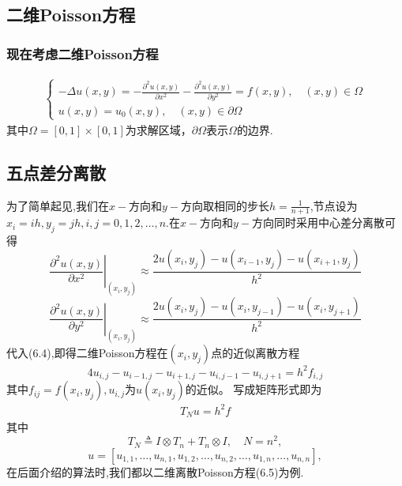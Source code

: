 \documentclass[12pt,a4paper]{article}
\begin{document}
\subsection{\color{blue}二维Poisson方程}
\subsubsection*{现在考虑二维Poisson方程}
\begin{align}
\left\{\begin{array}{l}{-\Delta u(x, y)=-\frac{\partial^{2} u(x, y)}{\partial x^{2}}-\frac{\partial^{2} u(x, y)}{\partial y^{2}}=f(x, y), \quad(x, y) \in \Omega} \\ {u(x, y)=u_{0}(x, y), \quad(x, y) \in \partial \Omega}\end{array}\right.
\tag{6.4}
\end{align}
其中$\Omega=[0,1] \times[0,1]$为求解区域，$\partial \Omega$表示$\Omega$的边界.
\subsection*{ 五点差分离散}
为了简单起见,我们在$x-$方向和$y-$方向取相同的步长$h=\frac{1}{n+1}$,节点设为
$x_{i}=i h, y_{j}=j h, i, j=0,1,2, \ldots, n.$在$x-$方向和$y-$方向同时采用中心差分离散可得
$$
\left.\frac{\partial^{2} u(x, y)}{\partial x^{2}}\right|_{\left(x_{i}, y_{j}\right)} \approx \frac{2 u\left(x_{i}, y_{j}\right)-u\left(x_{i-1}, y_{j}\right)-u\left(x_{i+1}, y_{j}\right)}{h^{2}}
$$
$$
\left.\frac{\partial^{2} u(x, y)}{\partial y^{2}}\right|_{\left(x_{i}, y_{j}\right)} \approx \frac{2 u\left(x_{i}, y_{j}\right)-u\left(x_{i}, y_{j-1}\right)-u\left(x_{i}, y_{j+1}\right)}{h^{2}}
$$
代入({\color{blue}6.4}),即得二维Poisson方程在$(x_i, y_j)$点的近似离散方程
$$
\boxed {4 u_{i, j}-u_{i-1, j}-u_{i+1, j}-u_{i, j-1}-u_{i, j+1}=h^{2} f_{i, j}}
$$  
其中$f_{i j}=f\left(x_{i}, y_{j}\right), u_{i, j}$为$u\left(x_{i}, y_{j}\right)$的近似。
写成矩阵形式即为
\begin{align}
T_{N} u=h^{2} f
\tag{6.5}
\end{align}
其中
$$
T_{N} \triangleq I \otimes T_{n}+T_{n} \otimes I, \quad N=n^{2},
$$
$$
u=\left[u_{1,1}, \ldots, u_{n, 1}, u_{1,2}, \ldots, u_{n, 2}, \ldots, u_{1, n}, \ldots, u_{n, n}\right],
$$
在后面介绍的算法时,我们都以二维离散Poisson方程({\color{blue}6.5})为例.
\end{document}
